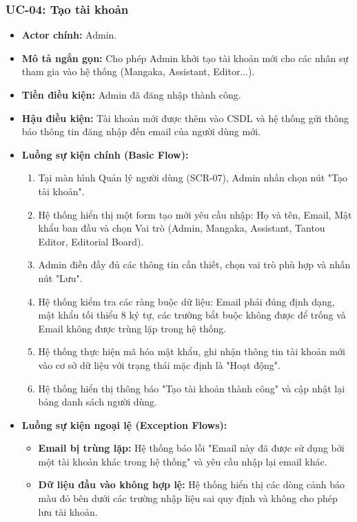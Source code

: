 \subsubsection{UC-04: Tạo tài khoản}
\label{subsubsec:uc04_create_user}
\begin{itemize}
    \item \textbf{Actor chính:} Admin.
    \item \textbf{Mô tả ngắn gọn:} Cho phép Admin khởi tạo tài khoản mới cho các nhân sự tham gia vào hệ thống (Mangaka, Assistant, Editor...).
    \item \textbf{Tiền điều kiện:} Admin đã đăng nhập thành công.
    \item \textbf{Hậu điều kiện:} Tài khoản mới được thêm vào CSDL và hệ thống gửi thông báo thông tin đăng nhập đến email của người dùng mới.
    \item \textbf{Luồng sự kiện chính (Basic Flow):}
        \begin{enumerate}
            \item Tại màn hình Quản lý người dùng (SCR-07), Admin nhấn chọn nút "Tạo tài khoản".
            \item Hệ thống hiển thị một form tạo mới yêu cầu nhập: Họ và tên, Email, Mật khẩu ban đầu và chọn Vai trò (Admin, Mangaka, Assistant, Tantou Editor, Editorial Board).
            \item Admin điền đầy đủ các thông tin cần thiết, chọn vai trò phù hợp và nhấn nút "Lưu".
            \item Hệ thống kiểm tra các ràng buộc dữ liệu: Email phải đúng định dạng, mật khẩu tối thiểu 8 ký tự, các trường bắt buộc không được để trống và Email không được trùng lặp trong hệ thống.
            \item Hệ thống thực hiện mã hóa mật khẩu, ghi nhận thông tin tài khoản mới vào cơ sở dữ liệu với trạng thái mặc định là "Hoạt động".
            \item Hệ thống hiển thị thông báo "Tạo tài khoản thành công" và cập nhật lại bảng danh sách người dùng.
        \end{enumerate}
    \item \textbf{Luồng sự kiện ngoại lệ (Exception Flows):}
        \begin{itemize}
            \item \textbf{Email bị trùng lặp:} Hệ thống báo lỗi "Email này đã được sử dụng bởi một tài khoản khác trong hệ thống" và yêu cầu nhập lại email khác.
            \item \textbf{Dữ liệu đầu vào không hợp lệ:} Hệ thống hiển thị các dòng cảnh báo màu đỏ bên dưới các trường nhập liệu sai quy định và không cho phép lưu tài khoản.
        \end{itemize}
\end{itemize}

